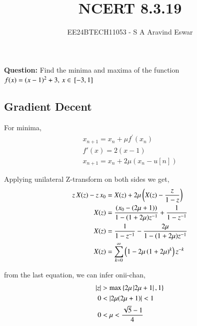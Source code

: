 \documentclass[journal]{IEEEtran}
\begin{document}

\vspace{3cm}

\title{NCERT 8.3.19}
\author{EE24BTECH11053 - S A Aravind Eswar}
{\let\newpage\relax\maketitle}

\renewcommand{\thefigure}{\theenumi}
\renewcommand{\thetable}{\theenumi}
\setlength{\intextsep}{10pt} %

\textbf{Question:} Find the minima and maxima of the function $f(x) = (x-1)^2 + 3,\,x \in {}\left[-3, 1\right]$

\subsection{Gradient Decent}
For minima,
\begin{align}
    x_{n+1} = x_n + \mu f^\prime(x_n)\\
    f\prime(x) = 2(x-1)\\
    x_{n+1} = x_n + 2\mu (x_n-u[n])
\end{align}

Applying unilateral Z-transform on both sides we get,
\begin{align}
    z \,X(z) - z\,x_0 &= X(z) + 2\mu\left(X(z) - \frac{z}{1-z}\right)\\
    X(z) &= \frac{(x_0 - (2\mu+1))}{1-(1+2\mu)z^{-1}} + \frac{1}{1-z^{-1}}\\
    X(z) &= \frac{1}{1-z^{-1}} - \frac{2\mu}{1-(1+2\mu)z^{-1}}\\
    X(z) &= \sum_{k=0}^{\infty} \left(1 - 2\mu\left(1+2\mu\right)^k\right)z^{-k}
\end{align}

from the last equation, we can infer onii-chan,
\begin{align}
    \left\vert z\right\vert &> \max{\ensuremath{\left\{2\mu\left\vert2\mu + 1\right\vert,1\right\}}}\\
    0 &< \left\vert2\mu(2\mu + 1)\right\vert < 1\\
    0 &< \mu < \frac{\sqrt{5}-1}{4}
\end{align}
\end{document}

